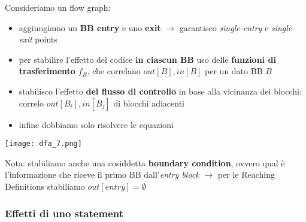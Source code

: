 \noindent\begin{minipage}[c]{.67\textwidth}
  Consideriamo un flow graph:
  \begin{itemize}
    \item aggiungiamo un \textbf{BB entry} e uno \textbf{exit} $\rightarrow$ garantisco \textit{single-entry} e \textit{single-exit} points
    \item per stabilire l'effetto del codice \textbf{in ciascun BB} uso delle \textbf{funzioni di trasferimento} $f_{B}$, che correlano $out[B], in[B]$ per un dato BB $B$
    \item stabilisco l'effetto \textbf{del flusso di controllo} in base alla vicinanza dei blocchi: correlo $out[B_{i}], in[B_{j}]$ di blocchi adiacenti
    \item infine dobbiamo solo risolvere le equazioni 
  \end{itemize}
\end{minipage}
\hfill
\begin{minipage}[c]{.3\textwidth}
  \texttt{[image: dfa\_7.png]}
\end{minipage}

\vspace{-1em}
\begin{emphasize}
  Nota: stabiliamo anche una cosiddetta \textbf{boundary condition}, ovvero qual \`e l'informazione che riceve il primo BB dall'\textit{entry block} $\rightarrow$ per le Reaching Definitions stabiliamo $out[entry] = \emptyset$
\end{emphasize}


\subsubsection{Effetti di uno statement}

